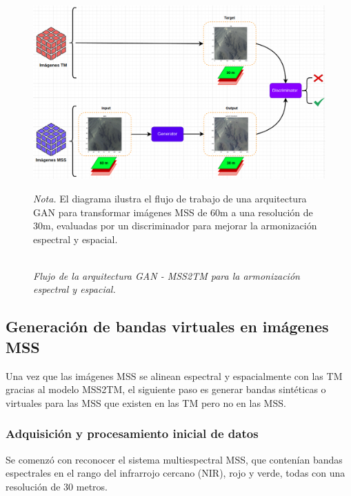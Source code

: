                     \begin{figure}[H] 
                        \caption{\doublespacing \\ \textit{Flujo  de la arquitectura GAN - MSS2TM para la armonización espectral y espacial.}} 
                        \centering
                        \includegraphics[width=1\linewidth]{2_CAPITULO4/IMG/GAN.png}
                        \begin{justify}
                            \textit{Nota.} El diagrama ilustra el flujo de trabajo de una arquitectura GAN para transformar imágenes MSS de 60m a una resolución de 30m, evaluadas por un discriminador para mejorar la armonización espectral y espacial​.
                        \end{justify}                    
                        \label{gan}
                    \end{figure}

        \subsection{Generación de bandas virtuales en imágenes MSS}
            Una vez que las imágenes MSS se alinean espectral y espacialmente con las TM gracias al modelo MSS2TM, el siguiente paso es generar bandas sintéticas o virtuales para las MSS que existen en las TM pero no en las MSS. 
            
            \subsubsection{Adquisición y procesamiento inicial de datos}
                Se comenzó con reconocer el sistema multiespectral MSS, que contenían bandas espectrales en el rango del infrarrojo cercano (NIR), rojo y verde, todas con una resolución de 30 metros.

